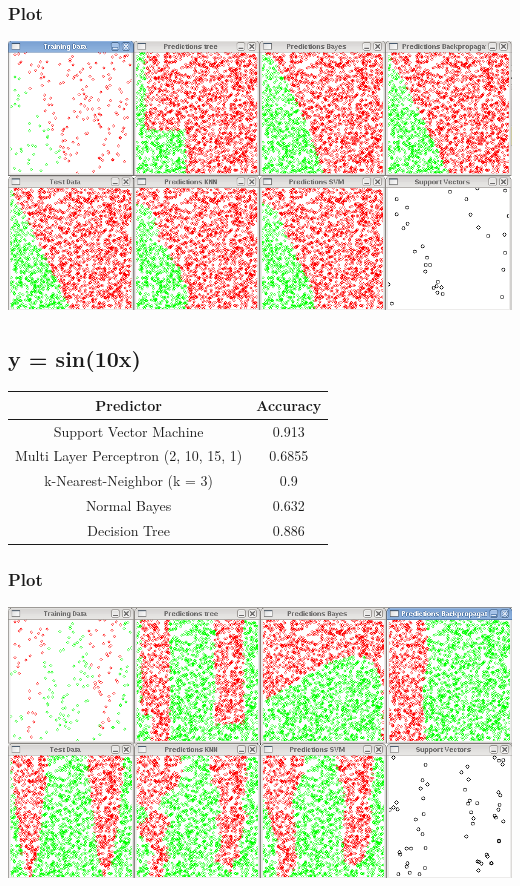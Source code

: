 \subsubsection{Plot}
\begin{center}
\includegraphics[scale=0.4]{img/eval/2x.png}
\end{center}

\subsection{y = sin(10x)}

\begin{center}
\begin{tabular}{|c|c|}
\hline
Predictor &	Accuracy\\ \hline\hline
Support Vector Machine &	0.913\\ \hline
Multi Layer Perceptron (2, 10, 15, 1) & 0.6855\\ \hline
k-Nearest-Neighbor (k = 3) & 0.9\\ \hline
Normal Bayes & 0.632\\ \hline
Decision Tree &	0.886\\ \hline
\end{tabular}
\end{center}

\subsubsection{Plot}
\begin{center}
\includegraphics[scale=0.4]{img/eval/sin10x.png}
\end{center}


